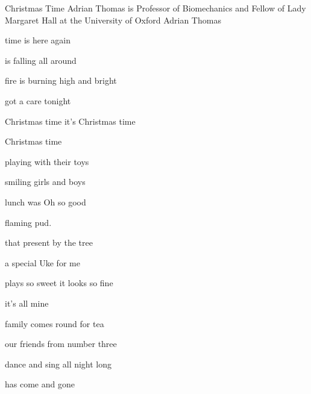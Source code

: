 \begin{SBSong}{Christmas Time}
  {Adrian Thomas is Professor of Biomechanics and Fellow of Lady Margaret Hall at the University of Oxford}
  {Adrian Thomas}
  \begin{SBVerse}
     time is here again
    
     is falling all around
    
     fire is burning high and bright
    
      got a care tonight
  \end{SBVerse}
  \begin{SBChorus}
     Christmas time it's Christmas time
    
     Christmas time 
  \end{SBChorus}
  \begin{SBVerse}
     playing with their toys
    
     smiling girls and boys
    
     lunch was Oh so good

      flaming pud.
  \end{SBVerse}
  \begin{SBVerse}
     that present by the tree
    
     a special Uke for me

     plays so sweet it looks so fine

      it's all mine
  \end{SBVerse}
  \begin{SBVerse}
     family comes round for tea

     our friends from number three

     dance and sing all night long

      has come and gone
  \end{SBVerse}
\end{SBSong}
